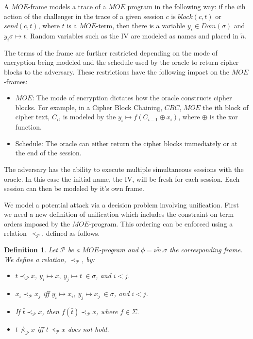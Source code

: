 \documentclass{easychair}
\newtheorem{definition}{Definition}
\begin{document}
A $MOE$-frame models a trace of a $MOE$ program in the following way:
if the $i$th action of the challenger in the trace of a given session $c$ is 
$block(c, t)$ or $send(c, t)$, where $t$ is a $MOE$-term, 
then there is a variable $y_i \in Dom(\sigma)$ and 
$y_i \sigma \mapsto t$. Random variables such as the IV are 
modeled as names and placed in $\tilde{n}$.

The terms of the frame are further restricted depending on the mode of encryption being modeled and the schedule used by the oracle to
return cipher blocks to the adversary. These restrictions have
the following impact on the $MOE$-frames:
\begin{itemize}
	\item $MOE$: The mode of encryption dictates how the oracle 
	constructs cipher blocks. For example, in a Cipher Block Chaining,
	$CBC$, $MOE$ the ith block of cipher text, $C_i$, is modeled by
	the $y_i \mapsto f(C_{i-1} \oplus x_i)$, where $\oplus$ is
	the xor function.
	\item Schedule: The oracle can either return the 
	cipher blocks immediately or at the end of the session.  
\end{itemize}

The adversary has the ability to execute multiple simultaneous sessions with the oracle. In this case the initial name, the IV, will be fresh for each session. Each session can then be modeled by it's own frame. 




We model a potential attack via a decision problem involving unification. First we need a new definition of unification which includes the 
constraint on term orders imposed by the $MOE$-program. This 
ordering can be enforced using a relation $\prec_{\mathcal{P}}$, defined 
as follows. 

\begin{definition}
	Let $\mathcal{P}$ be a $MOE$-program and $\phi = \nu \tilde{n}.\sigma$ the corresponding frame. We define a relation, 
	$\prec_{\mathcal{P}}$, by:
	\begin{itemize}
		\item $t \prec_{\mathcal{P}} x$,
		$y_i \mapsto x, ~y_j \mapsto t ~ \in \sigma$, and
		$ i < j$.
		\item $x_i \prec_{\mathcal{P}} x_j$ iff 
		 $y_i \mapsto x_i, ~y_j \mapsto x_j ~ \in \sigma$, and
		 $ i < j$.
		 \item If $\bar{t} \prec_{\mathcal{P}} x$, then 
		 $f(\bar{t}) \prec_{\mathcal{P}} x$, where $f \in \Sigma$.
		 \item $t \not \prec_{\mathcal{P}} x$ iff $t \prec_{\mathcal{P}} x$ does not hold.
	\end{itemize}
\end{definition}
\end{document}
